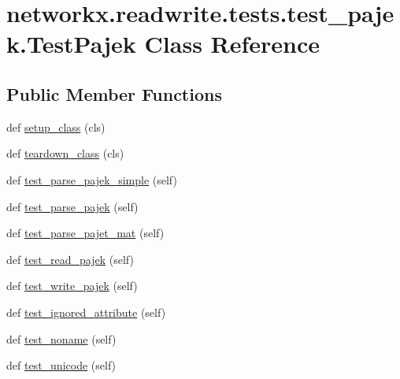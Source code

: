 \hypertarget{classnetworkx_1_1readwrite_1_1tests_1_1test__pajek_1_1TestPajek}{}\section{networkx.\+readwrite.\+tests.\+test\+\_\+pajek.\+Test\+Pajek Class Reference}
\label{classnetworkx_1_1readwrite_1_1tests_1_1test__pajek_1_1TestPajek}
\subsection*{Public Member Functions}
\begin{DoxyCompactItemize}
\item 
def \hyperlink{classnetworkx_1_1readwrite_1_1tests_1_1test__pajek_1_1TestPajek_a540afe46a32be22ff0646466a9cd7b3f}{setup\+\_\+class} (cls)
\item 
def \hyperlink{classnetworkx_1_1readwrite_1_1tests_1_1test__pajek_1_1TestPajek_a352068260e7977693b3f8a095d8fea7b}{teardown\+\_\+class} (cls)
\item 
def \hyperlink{classnetworkx_1_1readwrite_1_1tests_1_1test__pajek_1_1TestPajek_a572673807bbd87a80308f288949900ac}{test\+\_\+parse\+\_\+pajek\+\_\+simple} (self)
\item 
def \hyperlink{classnetworkx_1_1readwrite_1_1tests_1_1test__pajek_1_1TestPajek_af3b8030bc4d025440fe81ac7b1e41be5}{test\+\_\+parse\+\_\+pajek} (self)
\item 
def \hyperlink{classnetworkx_1_1readwrite_1_1tests_1_1test__pajek_1_1TestPajek_a8cccabd770ed12f45b715f72825aa155}{test\+\_\+parse\+\_\+pajet\+\_\+mat} (self)
\item 
def \hyperlink{classnetworkx_1_1readwrite_1_1tests_1_1test__pajek_1_1TestPajek_abd2b4c398aa8d32503c83e4232e5e852}{test\+\_\+read\+\_\+pajek} (self)
\item 
def \hyperlink{classnetworkx_1_1readwrite_1_1tests_1_1test__pajek_1_1TestPajek_ad915f25402c4e8df1fc0e9b2480a8a0b}{test\+\_\+write\+\_\+pajek} (self)
\item 
def \hyperlink{classnetworkx_1_1readwrite_1_1tests_1_1test__pajek_1_1TestPajek_a1b696fc9e5ca022f644e1e25b0351c60}{test\+\_\+ignored\+\_\+attribute} (self)
\item 
def \hyperlink{classnetworkx_1_1readwrite_1_1tests_1_1test__pajek_1_1TestPajek_aedb63cf3ad751f038df5dc138ef89f7e}{test\+\_\+noname} (self)
\item 
def \hyperlink{classnetworkx_1_1readwrite_1_1tests_1_1test__pajek_1_1TestPajek_ab05116e7ce38086283515a002df057ff}{test\+\_\+unicode} (self)
\end{DoxyCompactItemize}
